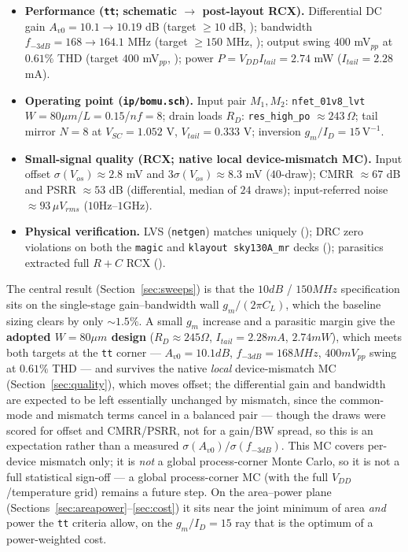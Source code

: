 \documentclass{article}
\begin{document}
\begin{itemize}
  \item \textbf{Performance (\texttt{tt}; schematic $\rightarrow$ post-layout RCX).}
    Differential DC gain $A_{v0}=10.1\rightarrow10.19$ dB (target $\ge10$ dB,
    \checkmark); bandwidth $f_{-3dB}=168\rightarrow164.1$ MHz (target $\ge150$ MHz,
    \checkmark); output swing $400$ mV$_{pp}$ at $0.61\%$ THD (target $400$ mV$_{pp}$,
    \checkmark); power $P=V_{DD}I_{tail}=2.74$ mW ($I_{tail}=2.28$ mA).
  \item \textbf{Operating point (\texttt{ip/bomu.sch}).} Input pair $M_1,M_2$:
    \texttt{nfet\_01v8\_lvt} $W{=}80\mu m$/$L{=}0.15$/$nf{=}8$; drain loads $R_D$:
    \texttt{res\_high\_po} $\approx243\,\Omega$; tail mirror $N{=}8$ at
    $V_{SC}=1.052$ V, $V_{tail}=0.333$ V; inversion $g_m/I_D=15\,\mathrm{V^{-1}}$.
  \item \textbf{Small-signal quality (RCX; native local device-mismatch MC).} Input
    offset $\sigma(V_{os})\approx2.8$ mV and $3\sigma(V_{os})\approx8.3$ mV ($40$-draw);
    CMRR $\approx67$ dB and PSRR $\approx53$ dB (differential, median of $24$ draws);
    input-referred noise $\approx93\,\mu V_{rms}$ ($10$Hz--$1$GHz).
  \item \textbf{Physical verification.} LVS (\texttt{netgen}) matches uniquely
    (\checkmark); DRC zero violations on both the \texttt{magic} and
    \texttt{klayout sky130A\_mr} decks (\checkmark); parasitics extracted full $R{+}C$
    RCX (\checkmark).
\end{itemize}

The central result (Section~\ref{sec:sweeps}) is that the $10dB$ / $150MHz$
specification sits on the single-stage gain--bandwidth wall $g_m/(2\pi C_L)$, which the
baseline sizing clears by only $\sim1.5\%$. A small $g_m$ increase and a parasitic
margin give the \textbf{adopted $W=80\mu m$ design}
($R_D\approx245\Omega$, $I_{tail}=2.28mA$, $2.74mW$), which meets both targets at the
\texttt{tt} corner --- $A_{v0}=10.1dB$, $f_{-3dB}=168MHz$, $400mV_{pp}$ swing at
$0.61\%$ THD --- and survives the native \emph{local} device-mismatch MC
(Section~\ref{sec:quality}), which moves offset; the differential gain and bandwidth are
expected to be left essentially unchanged by mismatch, since the common-mode and mismatch
terms cancel in a balanced pair --- though the draws were scored for offset and
CMRR/PSRR, not for a gain/BW spread, so this is an expectation rather than a measured
$\sigma(A_{v0})/\sigma(f_{-3dB})$. This MC covers per-device mismatch only; it is
\emph{not} a global process-corner Monte Carlo, so it is not a full statistical sign-off
--- a global process-corner MC (with the full $V_{DD}$/temperature grid) remains a future
step. On the area--power plane (Sections~\ref{sec:areapower}--\ref{sec:cost})
it sits near the joint minimum of area \emph{and} power the \texttt{tt} criteria allow,
on the $g_m/I_D=15$ ray that is the optimum of a power-weighted cost.
\end{document}
